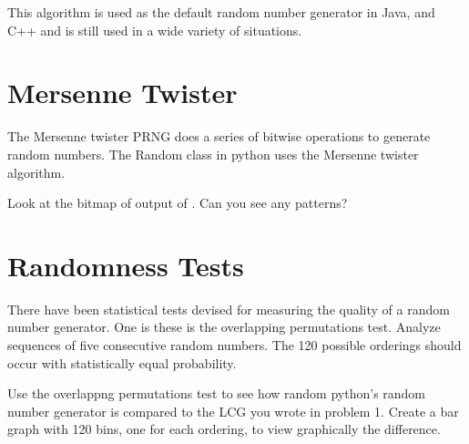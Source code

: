 This algorithm is used as the default random number generator in Java, and C++ and is still used in a wide variety of situations.

\section*{Mersenne Twister}
\begin{comment}
(TO DO: decide how much of  this we want to keep) All numbers can be represented in bits as a base two number.
Computers are optimized to work with numbers in that manner.
The operators XOR, OR, and AND work on the bit representation of two numbers.

AND - if both numbers have a 1 in the ith place then the ith place is 1.
Otherwise the ith place is 0.

OR - if one or both numbers have a 1 in the ith place then the ith place is 1.
Otherwise the ith place is 0.

XOR - if only one of the two numbers has a 1 in the ith place then the ith place is 1.
If both or neither of the numbers has a 1 in the ith place, the ith place is 0.

In addition you can shift the bitwise number over a number of values.
For example, shifting 10100 to the right by one yields 1010 and shifting it to the left by one yields 101000.
This is really just division and multiplication by 2.
This can be done by $\ll$ and $\gg$ in python. 
\end{comment}

The Mersenne twister PRNG does a series of bitwise operations to generate random numbers.
The Random class in python uses the Mersenne twister algorithm. 

\begin{problem}
Look at the bitmap of output of .
Can you see any patterns?
\end{problem}

\section*{Randomness Tests}
There have been statistical tests devised for measuring the quality of a random number generator. One is these is the overlapping permutations test. Analyze sequences of five consecutive random numbers. The 120 possible orderings should occur with statistically equal probability.

\begin{problem}
Use the overlappng permutations test to see how random python's random number generator is compared to the LCG you wrote in problem 1.
Create a bar graph with 120 bins, one for each ordering, to view graphically the difference.
\end{problem}

